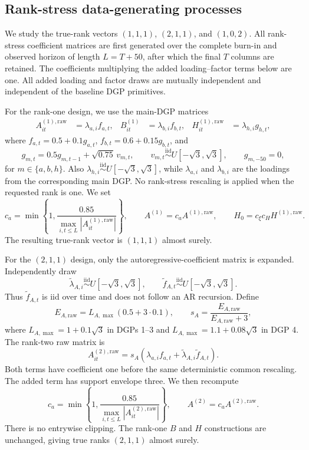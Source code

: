 \documentclass[11pt]{article}
\numberwithin{equation}{section}
\theoremstyle{remark}
\begin{document}
\subsection{Rank-stress data-generating processes}
\label{app:rank-stress-dgps}

We study the true-rank vectors $(1,1,1)$, $(2,1,1)$, and
$(1,0,2)$.  All rank-stress coefficient matrices are first generated over
the complete burn-in and observed horizon of length $L=T+50$, after which
the final $T$ columns are retained.  The coefficients multiplying the added loading--factor terms below are one.
All added loading and factor draws are mutually independent and independent
of the baseline DGP primitives.

For the rank-one design, we use the main-DGP matrices
\begin{align*}
 A_{it}^{(1),\mathrm{raw}}&=\lambda_{a,i}f_{a,t}, &
 B_{it}^{(1)}&=\lambda_{b,i}f_{b,t}, &
 H_{it}^{(1),\mathrm{raw}}&=\lambda_{h,i}g_{h,t},
\end{align*}
where $f_{a,t}=0.5+0.1g_{a,t}$,
$f_{b,t}=0.6+0.15g_{b,t}$, and
\[
 g_{m,t}=0.5g_{m,t-1}+\sqrt{0.75}\,v_{m,t},\qquad
 v_{m,t}\stackrel{\mathrm{iid}}{\sim}U[-\sqrt{3},\sqrt{3}],
 \qquad g_{m,-50}=0,
\]
for $m\in\{a,b,h\}$.  Also
$\lambda_{h,i}\stackrel{\mathrm{iid}}{\sim}U[-\sqrt{3},\sqrt{3}]$,
while $\lambda_{a,i}$ and $\lambda_{b,i}$ are the loadings from the
corresponding main DGP.  No rank-stress rescaling is applied when the
requested rank is one.  We set
\[
 c_a=\min\left\{1,
 \frac{0.85}{\max_{i,t\leq L}|A_{it}^{(1),\mathrm{raw}}|}\right\},
 \qquad A^{(1)}=c_aA^{(1),\mathrm{raw}},
 \qquad H_0=c_\xi c_H H^{(1),\mathrm{raw}}.
\]
The resulting true-rank vector is $(1,1,1)$ almost surely.

For the $(2,1,1)$ design, only the autoregressive-coefficient matrix is
expanded.  Independently draw
\[
 \widetilde\lambda_{A,i}\stackrel{\mathrm{iid}}{\sim}
 U[-\sqrt{3},\sqrt{3}],\qquad
 \widetilde f_{A,t}\stackrel{\mathrm{iid}}{\sim}
 U[-\sqrt{3},\sqrt{3}].
\]
Thus $\widetilde f_{A,t}$ is iid over time and does not follow an AR
recursion.  Define
\[
 E_{A,\mathrm{raw}}
 =L_{A,\max}(0.5+3\cdot0.1),\qquad
 s_A=\frac{E_{A,\mathrm{raw}}}{E_{A,\mathrm{raw}}+3},
\]
where $L_{A,\max}=1+0.1\sqrt{3}$ in DGPs 1--3 and
$L_{A,\max}=1.1+0.08\sqrt{3}$ in DGP 4.  The rank-two raw matrix is
\[
 A_{it}^{(2),\mathrm{raw}}
 =s_A\left(\lambda_{a,i}f_{a,t}
 +\widetilde\lambda_{A,i}\widetilde f_{A,t}\right).
\]
Both terms have coefficient one before the same deterministic common
rescaling.  The added term has support envelope three.  We then recompute
\[
 c_a=\min\left\{1,
 \frac{0.85}{\max_{i,t\leq L}|A_{it}^{(2),\mathrm{raw}}|}\right\},
 \qquad A^{(2)}=c_aA^{(2),\mathrm{raw}}.
\]
There is no entrywise clipping.  The rank-one $B$ and $H$ constructions
are unchanged, giving true ranks $(2,1,1)$ almost surely.
\end{document}
